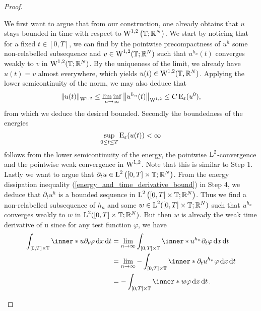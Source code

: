 \begin{proof}
\begin{description}[wide=0pt]
		We first want to argue that from our construction, one already obtains 
		that $ u $ stays bounded in time with respect to $ \operatorname{W}^{ 1 , 2 } 
		\left( \operatorname{\mathbb{T}} ; \mathbb{ R }^{ N } \right) $.
		We start by noticing that for a fixed $ t \in [ 0 , T ] $, we can find 
		by the pointwise precompactness of $ u^{ h } $ some
		non-relabelled subsequence and $ v \in \operatorname{W}^{ 1 , 2 } ( \operatorname{\mathbb{T}} ; 
		\mathbb{ R }^{ N } ) $ such that $ u^{ h_{ n } } ( t ) $ converges 
		weakly to $ v $ in $ \operatorname{W}^{ 1 , 2 } ( \operatorname{\mathbb{T}} ; \mathbb{ R }^{ N } ) 
		$. By the uniqueness of the limit, we already have $ u ( t ) = v $ 
		almost 
		everywhere, which yields $ u ( t ) \in \operatorname{W}^{ 1 , 2 } ( \operatorname{\mathbb{T}}, 
		\mathbb{ R }^{ N } ) $. Applying the lower semicontinuity of the norm, 
		we may also deduce 
		that
		\begin{equation*}
			\norm{ u ( t ) }_{ \operatorname{W}^{ 1 , 2 } }
			\leq
			\liminf_{ n \to \infty }
			\norm{ u^{ h_{ n } } ( t ) }_{ \operatorname{W}^{ 1 , 2 } }
			\leq
			C \operatorname{E}_{ \varepsilon } ( u^{ 0 } ),
		\end{equation*}
		from which we deduce the desired bounded.	
		Secondly the boundedness of the energies
		\begin{equation*}
			\sup_{ 0 \leq t \leq T }
			\operatorname{E}_{ \varepsilon } ( u ( t ) ) 
			< \infty
		\end{equation*}
		follows from the lower semicontinuity of the energy, the pointwise $ 
		\operatorname{L}^{ 2 } $-convergence and the pointwise weak convergence in $ \operatorname{W}^{ 
		1 , 
		2 } $. Note that this is similar to Step 1.
		Lastly we want to argue that $ \partial_{ t } u \in \operatorname{L}^{2 } \left( [ 0 
		, T ] \times \operatorname{\mathbb{T}} ; \mathbb{ R }^{ N } \right) $. 
		From the energy dissipation inequality 
		(\ref{energy_and_time_derivative_bound}) in Step 4, we deduce that $ 
		\partial_{ t } u^{ h } $ is a bounded sequence in $ \operatorname{L}^{ 2 } \left( [ 
		0 , T ] 
		\times \operatorname{\mathbb{T}}; \mathbb{ R }^{ N } \right) $. Thus we find a 
		non-relabelled subsequence of $ h_{ n } $ and some $ w \in \operatorname{L}^{ 2 } ( 
		[ 0 , T ] \times \operatorname{\mathbb{T}} ; \mathbb{ R }^{ N } ) $ such that $ u^{ 
		h_{n } } $ converges weakly to $ w $ in $ \operatorname{L}^{ 2 } ( [0, T ] \times 
		\operatorname{\mathbb{T}} ; \mathbb{ R }^{ N } ) $. But then $ w $ is already the weak 
		time derivative of u since for any test function $ \varphi $, we have
		\begin{align*}
			\int_{ [ 0 , T ] \times \flattorus }
			\inner*{ u }{ \partial_{ t } \varphi }
			\dd{ x } \dd{ t }
			& =
			\lim_{ n \to \infty }
			\int_{ [ 0 , T ] \times \flattorus }
			\inner*{ u^{ h_{ n } } }{ \partial_{ t } \varphi }
			\dd{ x } \dd{ t }
			\\
			& =
			\lim_{n \to \infty }
			- \int_{ [ 0 , T ] \times \flattorus }
			\inner*{ \partial_{ t } u^{ h_{ n } } }{ \varphi }
			\dd{ x }\dd{ t }
			\\
			& =
			- \int_{ [ 0 , T ] \times \flattorus }
			\inner*{ w }{ \varphi }
			\dd{ x } \dd{ t }.
		\end{align*}
		

\end{description}
\end{proof}
